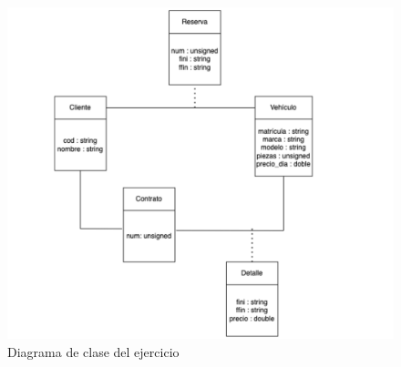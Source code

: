 \begin{figure}[h]
  \begin{center}
    \includegraphics[width=\textwidth]{assets/Junio2022_1.png}
  \end{center}
  \caption{Diagrama de clase del ejercicio}
\end{figure}

